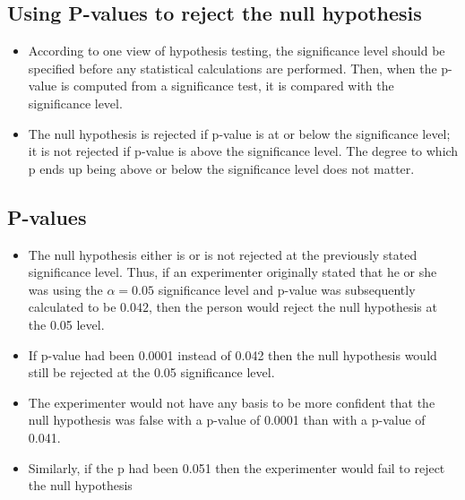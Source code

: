 \documentclass[]{report}
\begin{document}
	
	\subsection{Using P-values to reject the null hypothesis}
	\begin{itemize}
		\item According to one view of hypothesis testing, the significance level should be specified before any statistical calculations are performed. Then, when the p-value is computed from a significance test, it is compared with the significance level. 
		\item The null hypothesis is rejected if p-value is at or below the significance level; it is not rejected if p-value is above the significance level. The degree to which p ends up being above or below the significance level does not matter. 
	\end{itemize}
	
	
	\subsection{P-values}
	
	\begin{itemize}
		\item The null hypothesis either is or is not rejected at the previously stated significance level. Thus, if an experimenter originally stated that he or she was using the $\alpha = 0.05$ significance level and p-value was subsequently calculated to be $0.042$, then the person would reject the null hypothesis at the 0.05 level. \item If p-value had been 0.0001 instead of 0.042 then the null hypothesis would still be rejected at the 0.05 significance level.  \item 
		The experimenter would not have any basis to be more confident that the null hypothesis was false with a p-value of 0.0001 than with a p-value of 0.041. \item Similarly, if the p had been 0.051 then the experimenter would fail to reject the null hypothesis
	\end{itemize}
	
	
\end{document}
